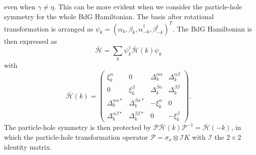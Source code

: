 \documentclass[12pt]{iopart}
\begin{document}
even when $\gamma\ne\eta$. This can be more evident when we consider the particle-hole symmetry for the whole BdG Hamiltonian. The basis after rotational transformation is arranged as $\psi_{k}=(\alpha_{k},\beta_{k},\alpha_{-k}^{\dag},\beta_{-k}^{\dag})^{T}$. The BdG Hamiltonian is then expressed as
\begin{equation*}
\bar{\mathcal{H}}=\sum_{k}\psi _{k}^{\dag }\bar{\mathcal{H}}\left( k\right) \psi _{k}
\end{equation*}%
with
\begin{equation*}
\bar{\mathcal{H}}\left( k\right) =\left(
\begin{array}{cccc}
\xi _{k}^{\alpha } & 0 & \Delta _{k}^{\alpha \alpha } & \Delta _{k}^{\alpha
\beta } \\
0 & \xi _{k}^{\beta } & \Delta _{k}^{\beta \alpha } & \Delta _{k}^{\beta
\beta } \\
\Delta _{k}^{\alpha \alpha \ast } & \Delta _{k}^{\beta \alpha \ast } & -\xi
_{k}^{\alpha } & 0 \\
\Delta _{k}^{\alpha \beta \ast } & \Delta _{k}^{\beta \beta \ast } & 0 &
-\xi _{k}^{\beta }%
\end{array}%
\right) .
\end{equation*}
The particle-hole symmetry is then protected by $\mathcal{P}\bar{\mathcal{H}}(k)\mathcal{P}^{-1}=\bar{\mathcal{H}}(-k)$, in which the particle-hole transformation operator $\mathcal{P}=\sigma_{x}\otimes\mathcal{I} K$ with $\mathcal{I}$ the $2\times 2$ identity matrix.
\end{document}
